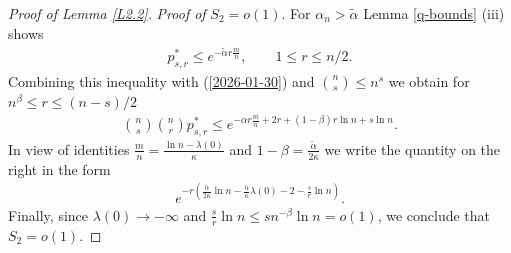 \documentclass[11pt, a4paper]{article}
\begin{document}
\begin{proof}[Proof of Lemma \ref{L2.2}]
 \smallskip
 
 {\it Proof of} $S_2=o(1)$. For
 $\alpha_n>{\tilde \alpha}$
 Lemma \ref{q-bounds} (iii) shows
 \begin{align*}
 p^*_{s,r}
 \le e^{-{\tilde \alpha} r\frac{m}{n}},
 \qquad
 1\le r\le n/2.
 \end{align*}
Combining this inequality with (\ref{2026-01-30}) and 
$\binom{n}{s}\le  n^s$ we obtain
for $n^{\beta}\le r\le (n-s)/2$
\begin{align*}
\binom{n}{s}
\binom{n}{r} 
p^*_{s,r}
\le
e^{-\alpha r\frac{m}{n}+2r+(1-\beta)r\ln n+s\ln n}.
\end{align*}
In view of 
 identities 
$\frac{m}{n}=\frac{\ln n-\lambda(0)}{\kappa}$ and 
$1-\beta=\frac{{\tilde \alpha}}{2\kappa}$ we write the quantity on the right in the form
\begin{align*}
e^{-r\left(\frac{{\tilde \alpha}}{2\kappa}\ln n-\frac{{\tilde \alpha}}{\kappa}\lambda(0) -2-\frac{s}{r}\ln n\right)}.
\end{align*}
Finally, since $\lambda(0)\to-\infty$ and $\frac{s}{r}\ln n\le sn^{-\beta}\ln n=o(1)$, we conclude that
$S_2=o(1)$.
\end{proof}
\end{document}
